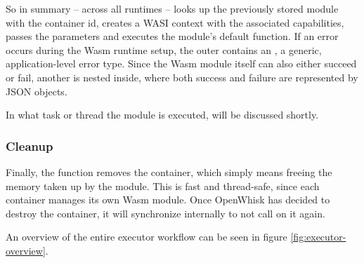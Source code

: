 So in summary -- across all runtimes --  looks up the previously stored module with the container id, creates a WASI context with the associated capabilities, passes the parameters and executes the module's default function. If an error occurs during the Wasm runtime setup, the outer  contains an , a generic, application-level error type. Since the Wasm module itself can also either succeed or fail, another  is nested inside, where both success and failure are represented by JSON objects.

In what task or thread the module is executed, will be discussed shortly.

\subsubsection{Cleanup}
Finally, the  function removes the container, which simply means freeing the memory taken up by the module. This is fast and thread-safe, since each container manages its own Wasm module. Once OpenWhisk has decided to destroy the container, it will synchronize internally to not call  on it again.

An overview of the entire executor workflow can be seen in figure \ref{fig:executor-overview}.

